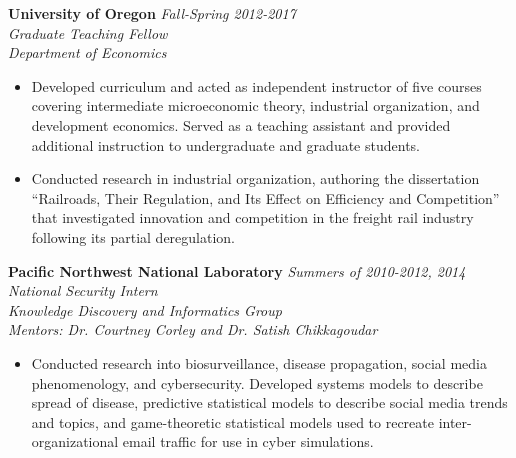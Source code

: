 \documentclass[11pt]{article}
\newenvironment{changemargin}[2]{%
  \begin{list}{}{%
    \setlength{\topsep}{0pt}%
    \setlength{\leftmargin}{#1}%
    \setlength{\rightmargin}{#2}%
    \setlength{\listparindent}{\parindent}%
    \setlength{\itemindent}{\parindent}%
    \setlength{\parsep}{\parskip}%
  }%
  \item[]}{\end{list}
}
\newenvironment{body} {
	\vspace*{-16pt}
	\begin{changemargin}{-0.25in}{-0.5in}
  }	
	{\end{changemargin}
}
\begin{document}
\begin{body}
	\textbf{University of Oregon} \hfill \emph{Fall-Spring 2012-2017}\\
	\emph{Graduate Teaching Fellow}\\
	\emph{Department of Economics}
	\vspace*{-4pt}
	\begin{itemize}
		\item Developed curriculum and acted as independent instructor of five courses covering intermediate microeconomic theory, industrial organization, and development economics. Served as a teaching assistant and provided additional instruction to undergraduate and graduate students.
		\item Conducted research in industrial organization, authoring the dissertation ``Railroads, Their Regulation, and Its Effect on Efficiency and Competition'' that investigated innovation and competition in the freight rail industry following its partial deregulation.
	\end{itemize}

	\textbf{Pacific Northwest National Laboratory}  \hfill \emph{Summers of 2010-2012, 2014}\\
	\emph{National Security Intern}\\ 
	\emph{Knowledge Discovery and Informatics Group}\\
	\emph{Mentors: Dr. Courtney Corley and Dr. Satish Chikkagoudar}
	\vspace*{-4pt}
	\begin{itemize}	
		\item Conducted research into biosurveillance, disease propagation, social media phenomenology, and cybersecurity. Developed systems models to describe spread of disease, predictive statistical models to describe social media trends and topics, and game-theoretic statistical models used to recreate inter-organizational email traffic for use in cyber simulations.
	\end{itemize}
				
\end{body}
\end{document}

